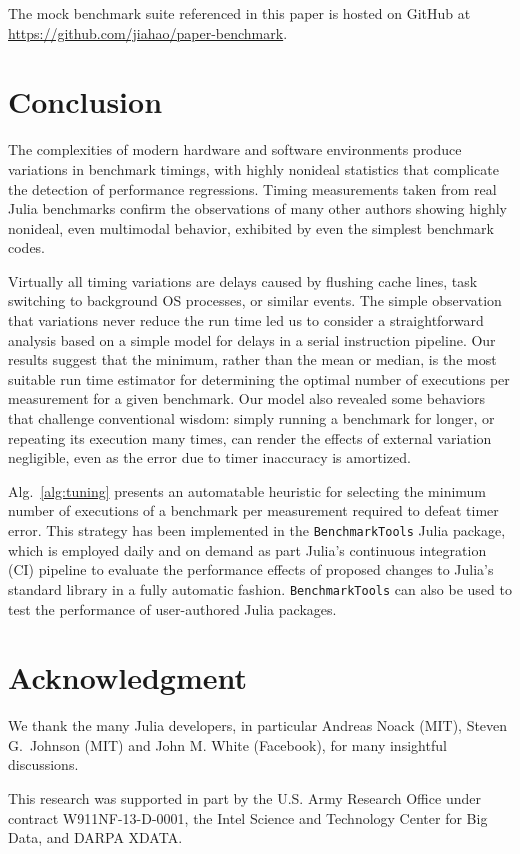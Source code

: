 \documentclass[conference]{IEEEtran}
\begin{document}
The mock benchmark suite referenced in this paper is hosted on GitHub at
\url{https://github.com/jiahao/paper-benchmark}.

\section{Conclusion}
\label{sec:conclusion}

The complexities of modern hardware and software environments produce
variations in benchmark timings, with highly nonideal statistics that
complicate the detection of performance regressions. Timing measurements taken
from real Julia benchmarks confirm the observations of many other authors
showing highly nonideal, even multimodal behavior, exhibited by even the
simplest benchmark codes.

Virtually all timing variations are delays caused by flushing cache lines, task
switching to background OS processes, or similar events. The simple
observation that variations never reduce the run time led us to consider a
straightforward analysis based on a simple model for delays in a serial
instruction pipeline. Our results suggest that the minimum, rather than
the mean or median, is the most suitable run time estimator for determining
the optimal number of executions per measurement for a given benchmark. Our
model also revealed some behaviors that challenge conventional wisdom: simply
running a benchmark for longer, or repeating its execution many times, can
render the effects of external variation negligible, even as the error due to
timer inaccuracy is amortized.

Alg.~\ref{alg:tuning} presents an automatable heuristic for selecting the
minimum number of executions of a benchmark per measurement required to defeat
timer error. This strategy has been implemented in the
\lstinline|BenchmarkTools| Julia package, which is employed daily and on demand
as part Julia's continuous integration (CI) pipeline to evaluate the
performance effects of proposed changes to Julia's standard library in a fully
automatic fashion. \lstinline|BenchmarkTools| can also be used to test the
performance of user-authored Julia packages.


\section*{Acknowledgment}
\label{sec:acknowledgement}

We thank the many Julia developers, in particular Andreas Noack (MIT), Steven
G.\ Johnson (MIT) and John M. White (Facebook), for many insightful
discussions.

This research was supported in part by the U.S. Army Research Office under
contract W911NF-13-D-0001, the Intel Science and Technology Center for Big
Data, and DARPA XDATA.




\end{document}
